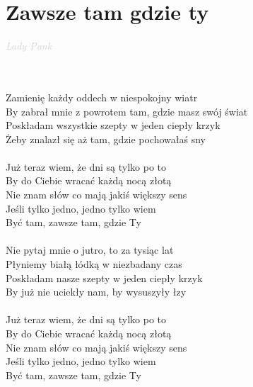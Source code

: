 \documentclass[a5paper, 10pt]{book}
\begin{document}
\section{Zawsze tam gdzie ty}\textcolor{lightgray}{\textit{Lady Pank}}\\~\\
\begin{minipage}[t]{0.7\textwidth}
  ~\\
  Zamienię każdy oddech w niespokojny wiatr\\
  By zabrał mnie z powrotem tam, gdzie masz swój świat\\
  Poskładam wszystkie szepty w jeden ciepły krzyk\\
  Żeby znalazł się aż tam, gdzie pochowałaś sny\\
  \\
  \hspace*{4mm}Już teraz wiem, że dni są tylko po to\\
  \hspace*{4mm}By do Ciebie wracać każdą nocą złotą\\
  \hspace*{4mm}Nie znam słów co mają jakiś większy sens\\
  \hspace*{4mm}Jeśli tylko jedno, jedno tylko wiem\\
  \hspace*{4mm}Być tam, zawsze tam, gdzie Ty\\
  \\
  Nie pytaj mnie o jutro, to za tysiąc lat\\
  Płyniemy białą łódką w niezbadany czas\\
  Poskładam nasze szepty w jeden ciepły krzyk\\
  By już nie uciekły nam, by wysuszyły łzy\\
  \\
  \hspace*{4mm}Już teraz wiem, że dni są tylko po to\\
  \hspace*{4mm}By do Ciebie wracać każdą nocą złotą\\
  \hspace*{4mm}Nie znam słów co mają jakiś większy sens\\
  \hspace*{4mm}Jeśli tylko jedno, jedno tylko wiem\\
  \hspace*{4mm}Być tam, zawsze tam, gdzie Ty\\

\end{minipage}
\end{document}
